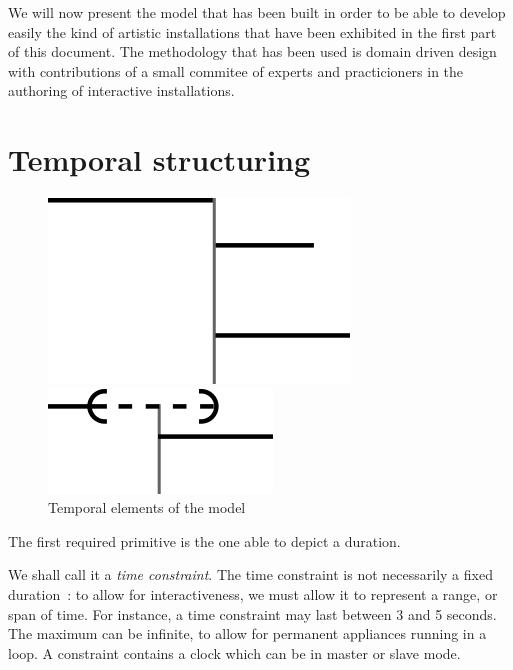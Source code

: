 \documentclass{sigchi}
\begin{document}
We will now present the model that has been built in order to be able to develop easily the kind of artistic installations that have been exhibited in the first part of this document. The methodology that has been used is domain driven design with contributions of a small commitee of experts and practicioners in the authoring of interactive installations. 
\section{Temporal structuring}
\label{sectemporal}
\begin{figure}[h]
    \centering
    \begin{minipage}[b]{.5\linewidth}
        \centering
        \includegraphics[scale=0.7]{images/timenode.png}
    \end{minipage}\begin{minipage}[b]{.5\linewidth}
    \centering
    \includegraphics[scale=0.7]{images/souple.png}
\end{minipage}	

\caption{Temporal elements of the model}
\label{fig.cst.timenode}
\end{figure}	

The first required primitive is the one able to depict a duration.

We shall call it a \textit{time constraint}.
The time constraint is not necessarily a fixed duration~: to allow for interactiveness, 
we must allow it to represent a range, or span of time. For instance, a time constraint may last between 3 and 5 seconds. The maximum can be infinite, to allow for permanent appliances running in a loop. A constraint contains a clock which can be in master or slave mode.
\end{document}
